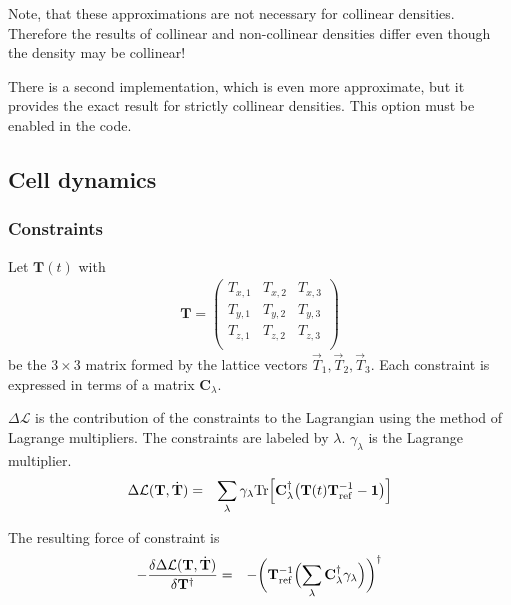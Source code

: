\documentclass[final,12pt,makeidx,DIV=calc]{article}
\newcommand{\mat}[1]{\mathbf{#1}}
\newcommand{\Tr}{\mathrm{Tr}}      %
\begin{document}
{{{{{{Note, that these approximations are not necessary for collinear
densities. Therefore the results of collinear and non-collinear
densities differ even though the density may be collinear!

There is a second implementation, which is even more approximate, but
it provides the exact result for strictly collinear densities. This
option must be enabled in the code.

\subsection{Cell dynamics}
\label{sec:celldynamics}
\subsubsection{Constraints}
\label{sec:unitcellconstraints}
Let $\mat{T}(t)$ with
\begin{eqnarray}
\mat{T}=\left(\begin{array}{ccc}
T_{x,1} & T_{x,2} & T_{x,3}\\
T_{y,1} & T_{y,2} & T_{y,3}\\
T_{z,1} & T_{z,2} & T_{z,3}\\
\end{array}\right)
\end{eqnarray}
be the $3\times3$ matrix formed by the lattice vectors
$\vec{T}_1,\vec{T}_2,\vec{T}_3$.  Each constraint is expressed in
terms of a matrix $\mat{C}_\lambda$. 


$\Delta\mathcal{L}$ is the contribution of the constraints to the
Lagrangian using the method of Lagrange multipliers.  The constraints
are labeled by $\lambda$. $\gamma_\lambda$ is the Lagrange
multiplier.
\begin{eqnarray}
    \Delta\mathcal{L}(\mat{T},\dot{\mat{T}})
&=& \sum_\lambda \gamma_\lambda
         \Tr\Bigl[\mat{C}^\dagger_\lambda
                  \bigl(\mat{T}(t)\mat{T}^{-1}_{\text{ref}}-\mat{1}\bigr)
                  \Bigr]
\end{eqnarray}

The resulting force of constraint is
\begin{eqnarray}
-\frac{\delta\Delta\mathcal{L}(\mat{T},\dot{\mat{T}})}{\delta \mat{T}^\dagger}
&=& -\biggl(\mat{T}^{-1}_{\text{ref}}
\Bigl(\sum_\lambda \mat{C}^\dagger_\lambda \gamma_\lambda
                  \Bigr)\biggr)^\dagger
\end{eqnarray}

}}}}}}
\end{document}
